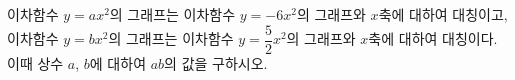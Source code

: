 이차함수 $y=ax^2$의 그래프는 이차함수 $y=-6x^2$의 그래프와 $x$축에 대하여 대칭이고, 이차함수 $y=bx^2$의 그래프는 이차함수 $y=\dfrac{5}{2}x^2$의 그래프와 $x$축에 대하여 대칭이다. 이때 상수 $a$, $b$에 대하여 $ab$의 값을 구하시오.
